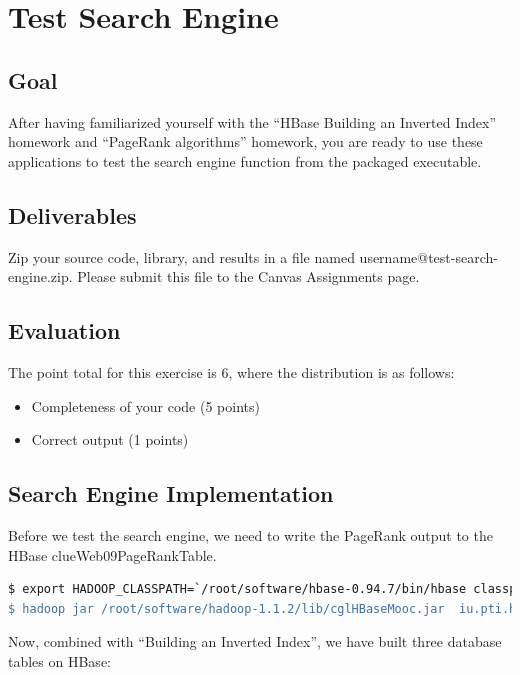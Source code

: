\section*{Test Search Engine}
\subsection*{Goal}
After having familiarized yourself with the ``HBase Building an Inverted
Index'' homework and ``PageRank algorithms'' homework, you are ready to use
these applications to test the search engine function from the packaged
executable.

\subsection*{Deliverables}
Zip your source code, library, and results in a file named
username@test-search-engine.zip. Please submit this file to the Canvas
Assignments page.

\subsection*{Evaluation}
The point total for this exercise is 6, where the distribution is as follows:
\begin{itemize}
\item Completeness of your code (5 points)
\item Correct output (1 points)
\end{itemize}

\subsection*{Search Engine Implementation}
Before we test the search engine, we need to write the PageRank output to the
HBase clueWeb09PageRankTable.

\begin{lstlisting}[language=bash]
$ export HADOOP_CLASSPATH=`/root/software/hbase-0.94.7/bin/hbase classpath'
$ hadoop jar /root/software/hadoop-1.1.2/lib/cglHBaseMooc.jar  iu.pti.hbaseapp.clueweb09.PageRankTableLoader  /root/MoocHomeworks/HBaseInvertedIndexing/resources/en0000-01and02.docToNodeIdx.txt  /root/MoocHomeworks/HBaseInvertedIndexing/resources/en0000-01and02_reset_idx_and_square_pagerank.out
\end{lstlisting}

Now, combined with ``Building an Inverted Index'', we have built three database
tables on HBase:

